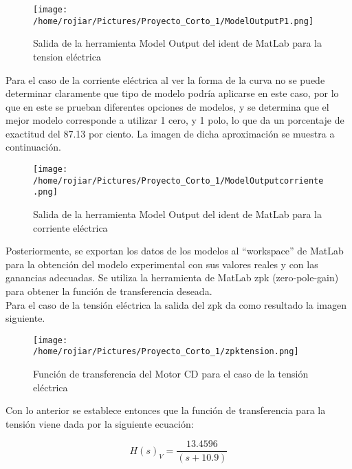 \documentclass[a4paper,10pt,twocolumn]{article}
\begin{document}
\begin{figure}[h]
\centering
\texttt{[image: /home/rojiar/Pictures/Proyecto\_Corto\_1/ModelOutputP1.png]}
\caption{Salida de la herramienta Model Output del ident de MatLab para la tension eléctrica}
\label{Salida de la herramienta Model Output del ident de MatLab para la tension electrica}
\end{figure}

\newpage

Para el caso de la corriente eléctrica al ver la forma de la curva no se puede determinar claramente que tipo de modelo podría aplicarse en este caso,
por lo que en este se prueban diferentes opciones de modelos, y se determina que el mejor modelo corresponde a utilizar 1 cero, y 1 polo, lo que da
un porcentaje de exactitud del 87.13 por ciento. La imagen de dicha aproximación se muestra a continuación.


\begin{figure}[h]
\centering
\texttt{[image: /home/rojiar/Pictures/Proyecto\_Corto\_1/ModelOutputcorriente.png]}
\caption{Salida de la herramienta Model Output del ident de MatLab para la corriente eléctrica}
\label{Salida de la herramienta Model Output del ident de MatLab para la corriente electrica}
\end{figure}

Posteriormente, se exportan los datos de los modelos al ``workspace'' de MatLab para la obtención del modelo experimental con sus valores reales
y con las ganancias adecuadas. Se utiliza la herramienta de MatLab zpk (zero-pole-gain) para obtener la función de transferencia deseada.\\

Para el caso de la tensión eléctrica la salida del zpk da como resultado la imagen siguiente.

\begin{figure}[h!]
\centering
\texttt{[image: /home/rojiar/Pictures/Proyecto\_Corto\_1/zpktension.png]}
\caption{Función de transferencia del Motor CD para el caso de la tensión eléctrica}
\label{Funcion de transferencia del Motor CD para el caso de la tension electrica}
\end{figure}

Con lo anterior se establece entonces que la función de transferencia para la tensión viene dada por la siguiente ecuación:


\begin{center}
$$
 H(s)_V = \frac{13.4596}{(s+10.9)}
$$  
\end{center}
\end{document}

